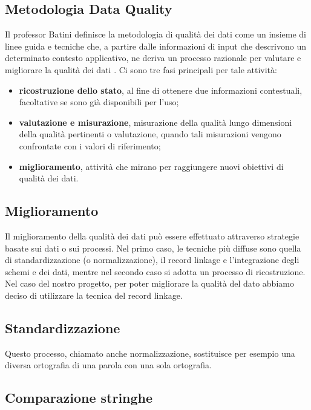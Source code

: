 \documentclass[a4paper,12pt]{article}
\begin{document}
\subsection{Metodologia Data Quality}

Il professor Batini definisce la metodologia di qualità dei dati come un insieme di linee guida e tecniche che, a partire dalle informazioni di input che descrivono un determinato contesto applicativo, ne deriva un processo razionale per valutare e migliorare la qualità dei dati \cite{10.1145/1541880.1541883}. Ci sono tre fasi principali per tale attività:
\begin{itemize}
\item \textbf{ricostruzione dello stato}, al fine di ottenere due informazioni contestuali, facoltative se sono già disponibili per l'uso;
\item \textbf{valutazione e misurazione}, misurazione della qualità lungo dimensioni della qualità pertinenti o valutazione, quando tali misurazioni vengono confrontate con i valori di riferimento;
\item \textbf{miglioramento}, attività che mirano per raggiungere nuovi obiettivi di qualità dei dati.
\end{itemize}

\subsection{Miglioramento}

Il miglioramento della qualità dei dati può essere effettuato attraverso strategie basate sui dati o sui processi. Nel primo caso, le tecniche più diffuse sono quella di standardizzazione (o normalizzazione), il record linkage e l'integrazione degli schemi e dei dati, mentre nel secondo caso si adotta un processo di ricostruzione. Nel caso del nostro progetto, per poter migliorare la qualità del dato abbiamo deciso di utilizzare la tecnica del record linkage. %

\subsection{Standardizzazione}

Questo processo, chiamato anche normalizzazione, sostituisce per esempio una diversa ortografia di una parola con una sola ortografia.

\subsection{Comparazione stringhe}
\end{document}
